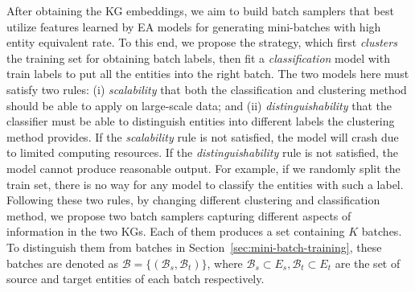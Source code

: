 After obtaining the KG embeddings, we aim to build batch samplers that best utilize features learned by EA models for generating mini-batches with high entity equivalent rate. To this end, we propose the \Sampling{} strategy, which first \emph{clusters} the training set for obtaining batch labels, then fit a \emph{classification} model with train labels to put all the entities into the right batch. The two models here must satisfy two rules: (i) \emph{scalability} that both the classification and clustering method should be able to apply on large-scale data; and (ii) \emph{distinguishability} that the classifier must be able to distinguish entities into different labels the clustering method provides. If the \emph{scalability} rule is not satisfied, the model will crash due to limited computing resources. If the \emph{distinguishability} rule is not satisfied, the model cannot produce reasonable output. For example, if we randomly split the train set, there is no way for any model to classify the entities with such a label. Following these two rules, by changing different clustering and classification method, we propose two batch samplers capturing different aspects of information in the two KGs. Each of them produces a set 
containing $K$ batches. To distinguish them from batches in Section~\ref{sec:mini-batch-training}, these batches are denoted as $\mathcal{B} = \{(\mathcal{B}_s, \mathcal{B}_t)\}$, where $\mathcal{B}_s \subset E_s, \mathcal{B}_t \subset E_t$ are the set of source and target entities of each batch respectively.  


